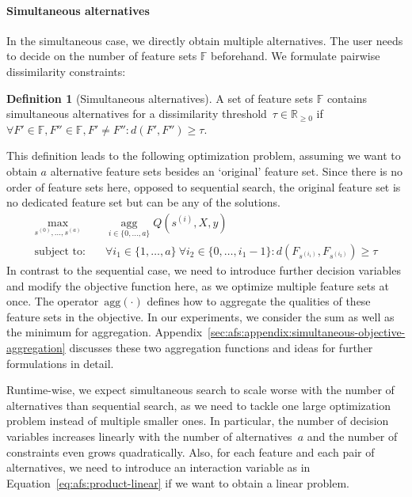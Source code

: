 \documentclass{article}
\theoremstyle{definition}
\newtheorem{definition}{Definition}
\begin{document}
\paragraph{Simultaneous alternatives}

In the simultaneous case, we directly obtain multiple alternatives.
The user needs to decide on the number of feature sets $\mathbb{F}$ beforehand.
We formulate pairwise dissimilarity constraints:
%
\begin{definition}[Simultaneous alternatives]
	A set of feature sets $\mathbb{F}$ contains simultaneous alternatives for a dissimilarity threshold~$\tau \in \mathbb{R}_{\geq 0}$ if $\forall F' \in \mathbb{F}, F'' \in \mathbb{F}, F' \neq F'': d(F',F'') \geq \tau$.
	\label{def:afs:simultaneous-alternative}
\end{definition}
%
This definition leads to the following optimization problem, assuming we want to obtain $a$ alternative feature sets besides an `original' feature set.
Since there is no order of feature sets here, opposed to sequential search, the original feature set is no dedicated feature set but can be any of the solutions.
%
\begin{equation}
	\begin{aligned}
		\max_{s^{(0)}, \dots, s^{(a)}} &\quad \operatorname*{agg}_{i \in \{0, \dots, a\}} Q(s^{(i)},X,y) \\
		\text{subject to:} &\quad \forall i_1 \in \{1, \dots, a\}~\forall i_2 \in \{0, \dots, i_1-1\}: d(F_{s^{(i_1)}},F_{s^{(i_2)}}) \geq \tau
	\end{aligned}
	\label{eq:afs:afs-simultaneous}
\end{equation}
%
In contrast to the sequential case, we need to introduce further decision variables and modify the objective function here, as we optimize multiple feature sets at once.
The operator~$\text{agg}(\cdot)$ defines how to aggregate the qualities of these feature sets in the objective.
In our experiments, we consider the sum as well as the minimum for aggregation.
Appendix~\ref{sec:afs:appendix:simultaneous-objective-aggregation} discusses these two aggregation functions and ideas for further formulations in detail.

Runtime-wise, we expect simultaneous search to scale worse with the number of alternatives than sequential search, as we need to tackle one large optimization problem instead of multiple smaller ones.
In particular, the number of decision variables increases linearly with the number of alternatives~$a$ and the number of constraints even grows quadratically.
Also, for each feature and each pair of alternatives, we need to introduce an interaction variable as in Equation~\ref{eq:afs:product-linear} if we want to obtain a linear problem.
\end{document}

